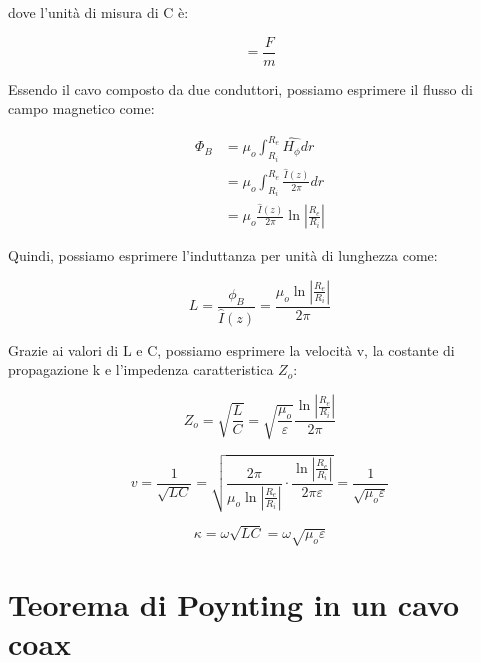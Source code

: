dove l'unità di misura di C è: 

{\Large \begin{equation}
    [C] = \frac{F}{m} 
\end{equation}} 

Essendo il cavo composto da due conduttori, possiamo esprimere il flusso di campo magnetico come: 

{\Large \begin{equation}
    \begin{split}
        \Phi_B 
        &= \mu_o \int_{R_i}^{R_e} \hat{H_\phi} dr \\  
        &= \mu_o \int_{R_i}^{R_e} \frac{\hat{I} (z)}{2 \pi} dr \\
        &= \mu_o \frac{\hat{I} (z)}{2 \pi} \ln \left|\frac{R_e}{R_i}\right| 
    \end{split}
\end{equation}} 

Quindi, possiamo esprimere l'induttanza per unità di lunghezza come: 

{\Large \begin{equation}
    L = \frac{\phi_B}{\hat{I}(z)} = \frac{\mu_o \ln \left|\frac{R_e}{R_i}\right|}{2 \pi}
\end{equation}}


Grazie ai valori di L e C, possiamo esprimere la velocità v, la costante di propagazione k e l'impedenza caratteristica $Z_o$: 

{\Large \begin{equation}
        Z_o = \sqrt{\frac{L}{C}} = \sqrt{\frac{\mu_o}{\varepsilon}} \frac{\ln \left|\frac{R_e}{R_i}\right| }{2 \pi} 
\end{equation}}

{\Large \begin{equation}
    v = \frac{1}{\sqrt{L C}} = \sqrt{\frac{2 \pi}{\mu_o \ln \left|\frac{R_e}{R_i}\right| } \cdot \frac{\ln \left|\frac{R_e}{R_i}\right|}{2 \pi \varepsilon}} = \frac{1}{\sqrt{\mu_o \varepsilon}}
\end{equation}} 

{\Large \begin{equation}
    \kappa = \omega \sqrt{L C} = \omega \sqrt{\mu_o \varepsilon}
\end{equation}}

\newpage 

\section{Teorema di Poynting in un cavo coax} 

